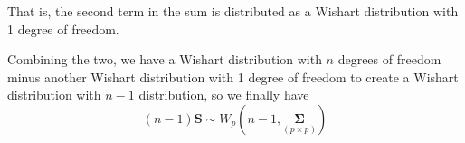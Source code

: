 \documentclass{article}
\begin{document}
    That is, the second term in the sum is distributed as a Wishart distribution with 1 degree of freedom.

    Combining the two, we have a Wishart distribution with $n$ degrees of freedom minus another Wishart distribution with 1 degree of freedom to create a Wishart distribution with $n - 1$ distribution, so we finally have
    \[
        (n-1)\textbf{S}
        \sim
        W_{p}\left(n-1, \underset{(p \times p)}{\bm{\Sigma}}\right)
    \]
\end{document}
